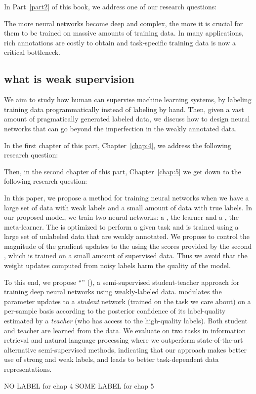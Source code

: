 In Part~\ref{part2} of this book, we address one of our research questions:
\begin{resqbox}
\emph{}
\end{resqbox}


The more neural networks become deep and complex, the more it is crucial for them to be trained on massive amounts of training data.
In many applications, rich annotations are costly to obtain and task-specific training data is now a critical bottleneck. 


\subsection{what is weak supervision}
We aim to study how human can supervise machine learning systems, by labeling training data programmatically instead of labeling by hand. Then, given a vast amount of pragmatically generated labeled data, we discuss how to design neural networks that can go beyond the imperfection in the weakly annotated data.


In the first chapter of this part, Chapter~\ref{chap:4}, we address the following research question:
\begin{resqbox}
\emph{}
\end{resqbox}

Then, in the second chapter of this part, Chapter~\ref{chap:5} we get down to the following research question:
\begin{resqbox}
\emph{}
\end{resqbox}



In this paper, we propose a method for training neural networks when we have a large set of data with weak labels and a small amount of data with true labels. In our proposed model, we train two neural networks: a \tnet, the learner and a \cnet, the meta-learner. 
The \tnet is optimized to perform a given task and is trained using a large set of unlabeled data that are weakly annotated. We propose to control the magnitude of the gradient updates to the \tnet using the scores provided by the second \cnet, which is trained on a small amount of supervised data. Thus we avoid that the weight updates computed from noisy labels harm the quality of the \tnet model.

To this end, we propose ``\fwlfulllc'' (\fwl), a semi-supervised student-teacher approach for training deep neural networks using weakly-labeled data. \fwl modulates the parameter updates to a \emph{student} network (trained on the task we care about) on a per-sample basis according to the posterior confidence of its label-quality estimated by a \emph{teacher} (who has access to the high-quality labels).  Both student and teacher are learned from the data. We evaluate \fwl on two tasks in information retrieval and natural language processing where we outperform state-of-the-art alternative semi-supervised methods, indicating that our approach makes better use of strong and weak labels, and leads to better task-dependent data representations.


NO LABEL for chap 4
SOME LABEL for chap 5

\medskip

% 
